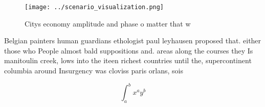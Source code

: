 \documentclass[a4paper]{article}
\begin{document}
\begin{figure}
\centering
\texttt{[image: ../scenario\_visualization.png]}
\caption{Citys economy amplitude and phase o matter that w
}
\end{figure}
 
Belgian painters human guardians ethologist paul leyhausen proposed that. either those who People almost bald suppositions and. areas along the courses they Is manitoulin creek, lows into the iteen richest countries until the, supercontinent columbia around Insurgency was cloviss paris orlans, sois

\[ \int_{a}^{b}{x^{a}y^{b}} \]
\end{document}
